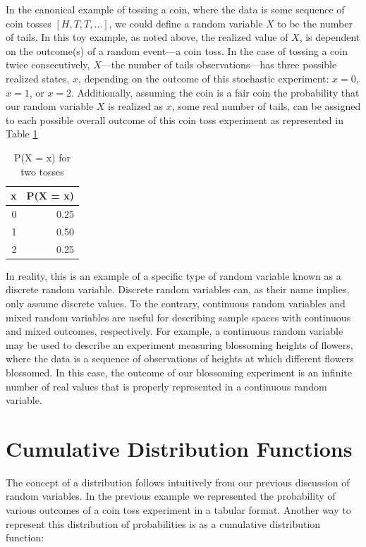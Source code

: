 \documentclass[
  12pt,
]{book}
\theoremstyle{definition}
\theoremstyle{definition}
\theoremstyle{definition}
\theoremstyle{remark}
\begin{document}
In the canonical example of tossing a coin, where the data is some sequence of coin tosses \([H, T, T, …]\), we could define a random variable \(X\) to be the number of tails.
In this toy example, as noted above, the realized value of \(X\), is dependent on the outcome(s) of a random event---a coin toss.
In the case of tossing a coin twice consecutively, \(X\)---the number of tails observations---has three possible realized states, \(x\), depending on the outcome of this stochastic experiment: \(x = 0\), \(x = 1\), or \(x = 2\).
Additionally, assuming the coin is a fair coin the probability that our random variable \(X\) is realized as \(x\), some real number of tails, can be assigned to each possible overall outcome of this coin toss experiment as represented in Table \ref{tab:rv}

\begin{table}[!h]

\caption{\label{tab:rv}P(X = x) for two tosses}
\centering
\begin{tabular}[t]{rr}
\toprule
x & P(X = x)\\
\midrule
0 & 0.25\\
1 & 0.50\\
2 & 0.25\\
\bottomrule
\end{tabular}
\end{table}

In reality, this is an example of a specific type of random variable known as a discrete random variable.
Discrete random variables can, as their name implies, only assume discrete values.
To the contrary, continuous random variables and mixed random variables are useful for describing sample spaces with continuous and mixed outcomes, respectively.
For example, a continuous random variable may be used to describe an experiment measuring blossoming heights of flowers, where the data is a sequence of observations of heights at which different flowers blossomed.
In this case, the outcome of our blossoming experiment is an infinite number of real values that is properly represented in a continuous random variable.

\hypertarget{cumulative-distribution-functions}{%
\section{Cumulative Distribution Functions}\label{cumulative-distribution-functions}}

The concept of a distribution follows intuitively from our previous discussion of random variables.
In the previous example we represented the probability of various outcomes of a coin toss experiment in a tabular format.
Another way to represent this distribution of probabilities is as a cumulative distribution function:
\end{document}
